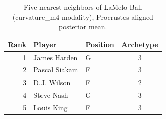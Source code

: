 \begin{table}[htbp]
  \centering\small
  \begin{tabular}{rllc}
    \toprule
    Rank & Player & Position & Archetype \\
    \midrule
    1 & James Harden & G & 3 \\
    2 & Pascal Siakam & F & 3 \\
    3 & D.J. Wilson & F & 2 \\
    4 & Steve Nash & G & 3 \\
    5 & Louis King & F & 3 \\
    \bottomrule
  \end{tabular}
  \caption{Five nearest neighbors of LaMelo Ball (curvature_m4 modality), Procrustes-aligned posterior mean.}
  \label{tab:LaMelo_Ball_neighbors_curvature_m4}
\end{table}

